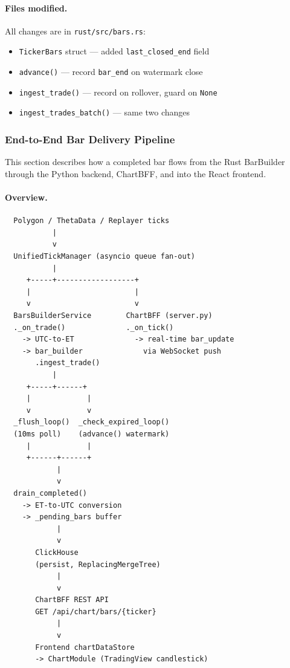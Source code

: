 \documentclass[a4paper, 11pt]{article}
\begin{document}
\paragraph{Files modified.}
All changes are in \texttt{rust/src/bars.rs}:
\begin{itemize}[nosep]
    \item \texttt{TickerBars} struct --- added \texttt{last\_closed\_end} field
    \item \texttt{advance()} --- record \texttt{bar\_end} on watermark close
    \item \texttt{ingest\_trade()} --- record on rollover, guard on \texttt{None}
    \item \texttt{ingest\_trades\_batch()} --- same two changes
\end{itemize}

\pagebreak



\subsubsection{End-to-End Bar Delivery Pipeline}
\label{sec:bar-delivery-pipeline}

This section describes how a completed bar flows from the Rust BarBuilder
through the Python backend, ChartBFF, and into the React frontend.

\paragraph{Overview.}

\begin{verbatim}
  Polygon / ThetaData / Replayer ticks
           |
           v
  UnifiedTickManager (asyncio queue fan-out)
           |
     +-----+------------------+
     |                        |
     v                        v
  BarsBuilderService        ChartBFF (server.py)
  ._on_trade()              ._on_tick()
    -> UTC-to-ET              -> real-time bar_update
    -> bar_builder              via WebSocket push
       .ingest_trade()
           |
     +-----+------+
     |             |
     v             v
  _flush_loop()  _check_expired_loop()
  (10ms poll)    (advance() watermark)
     |             |
     +------+------+
            |
            v
  drain_completed()
    -> ET-to-UTC conversion
    -> _pending_bars buffer
            |
            v
       ClickHouse
       (persist, ReplacingMergeTree)
            |
            v
       ChartBFF REST API
       GET /api/chart/bars/{ticker}
            |
            v
       Frontend chartDataStore
       -> ChartModule (TradingView candlestick)
\end{verbatim}
\end{document}
